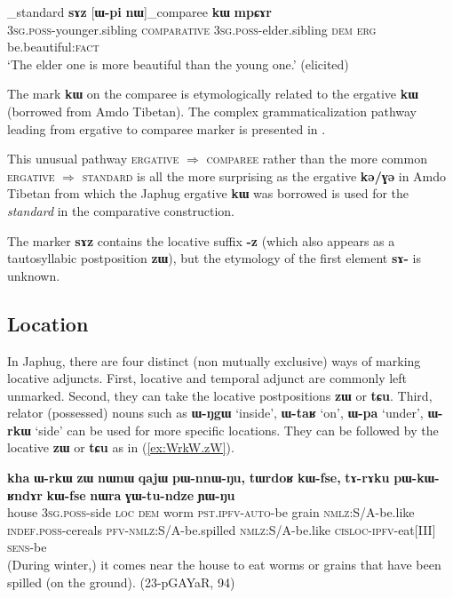 \documentclass[oldfontcommands,oneside,a4paper,11pt]{article}
\newcommand{\ipa}[1]{\mbox{\phon\textbf{#1}}} %
\begin{document}
\begin{exe}
\ex \label{ex:comp1}
\gll  [\ipa{ɯ-ʁi}]_{standard}   	\ipa{sɤz}   	[\ipa{ɯ-pi}   	\ipa{nɯ}]_{comparee}   	\ipa{\textbf{kɯ}}   	\ipa{mpɕɤr}     \\
\textsc{3sg.poss}-younger.sibling \textsc{comparative} \textsc{3sg.poss}-elder.sibling \textsc{dem} \textsc{erg}  be.beautiful:\textsc{fact} \\
\glt `The elder one is more beautiful than the young one.' (elicited)
\end{exe}

The mark \ipa{kɯ} on the comparee is etymologically related to the ergative \ipa{kɯ} (borrowed from Amdo Tibetan). The complex grammaticalization pathway leading from ergative to comparee marker is presented in \citet{jacques16comparative}. 

This unusual pathway \textsc{ergative} $\Rightarrow$ \textsc{comparee} rather than the more common \textsc{ergative} $\Rightarrow$ \textsc{standard} is all the more surprising as the ergative \ipa{kə/ɣə} in Amdo Tibetan from which the Japhug ergative \ipa{kɯ} was borrowed is used for the \textit{standard} in the comparative construction.

The marker \ipa{sɤz} contains the locative suffix \ipa{-z} (which also appears as a tautosyllabic postposition \ipa{zɯ}), but the etymology of the first element \ipa{sɤ-} is unknown. 

 \subsection{Location}   \label{sec:loc}
In Japhug, there are four distinct (non mutually exclusive) ways of marking locative adjuncts. First, locative and temporal adjunct are commonly left unmarked. Second, they can  take the locative postpositions \ipa{zɯ} or \ipa{tɕu}.  Third, relator (possessed) nouns such as \ipa{ɯ-ŋgɯ} `inside', \ipa{ɯ-taʁ} `on', \ipa{ɯ-pa} `under', \ipa{ɯ-rkɯ} `side' can be used for more specific locations. They can be followed by the locative \ipa{zɯ} or \ipa{tɕu} as in (\ref{ex:WrkW.zW}).

\begin{exe}
\ex \label{ex:WrkW.zW}
\gll \ipa{kha} 	\ipa{ɯ-rkɯ} 	\ipa{zɯ} 	\ipa{nɯnɯ} 	\ipa{qajɯ} 	\ipa{pɯ-nnɯ-ŋu,} 	\ipa{tɯrdoʁ} 	\ipa{kɯ-fse,} 	\ipa{tɤ-rɤku} 	\ipa{pɯ-kɯ-ʁndɤr} 	\ipa{kɯ-fse} 	\ipa{nɯra} 	\ipa{ɣɯ-tu-ndze} 	\ipa{ɲɯ-ŋu} \\
house \textsc{3sg.poss}-side \textsc{loc} \textsc{dem} worm \textsc{pst.ipfv-auto}-be grain \textsc{nmlz}:S/A-be.like \textsc{indef.poss}-cereals \textsc{pfv-nmlz}:S/A-be.spilled \textsc{nmlz}:S/A-be.like \textsc{cisloc-ipfv}-eat[III] \textsc{sens}-be \\
\glt (During winter,) it comes near the house to eat worms or grains that have been spilled (on the ground). (23-pGAYaR, 94)
\end{exe}
\end{document}
